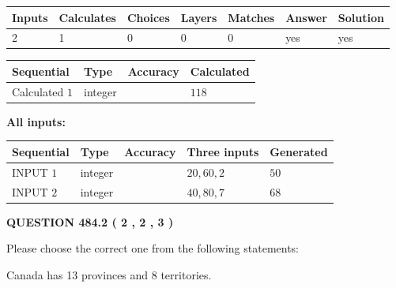 \documentclass[12pt]{article}
\begin{document}
 

 
   
   
   
   
\noindent\begin{tabular}{|l|l|l|l|l|l|l|}
 \hline
Inputs & Calculates & Choices & Layers & Matches & Answer & Solution \\ \hline
 2  & 
 1  & 
 0
  & 
 0  & 
 0  & 
  yes & 
  yes 
  \\ \hline
 \end{tabular}
   
   
   
   
\noindent{}
   
   
  
  
\noindent\begin{tabular}{|l|l|l|l|}
\hline
 Sequential & Type & Accuracy & Calculated \\ 
\hline
 
 
  Calculated $  1 $ & integer &  & 
  $ 118 $ 
 \\  \hline  
 \end{tabular}
   
   
   
   
\noindent\vspace{0.1in}\hspace{-0.08in} {\textbf{\Large{All inputs: }}}
   
   
  
  
\noindent\begin{tabular}{|l|l|l|l|l|}
\hline
 Sequential & Type & Accuracy & Three inputs & Generated \\ 
\hline
 
 
  INPUT $  1 $ & integer &  & $
 20
 , 
 60
 , 
 2
 $ & $ 50 $ 
 \\  \hline  
 
 
  INPUT $  2 $ & integer &  & $
 40
 , 
 80
 , 
 7
 $ & $ 68 $ 
 \\  \hline  
 \end{tabular}
   
   
  
\vspace{0.2in}
  
{\textbf{\Large{QUESTION
484.2 
 ( 2 , 2 , 3 )
}}}
  
  
Please choose the correct one from the following statements:
 
 
Canada has  13 provinces and  8 territories.
 
\end{document}
